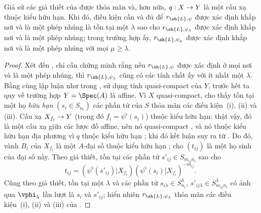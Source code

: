 \documentclass[oneside,10pt]{amsart}
\makeatletter
\renewcommand{\geq}{\geqslant}
\newcommand{\ega@arrow}[2]{\mathchoice{#1}{#2}{#2}{#2}}
\renewcommand{\to}{\ega@arrow{\longrightarrow}{\rightarrow}}
\newcommand{\oldpage}[2][]{\marginnote{\normalfont\footnotesize\textbf{#1}~|~#2}\ignorespaces}
\let\EGAOriginalLabel\label
\renewcommand{\label}[1]{\phantomsection\EGAOriginalLabel{#1}}
\makeatother
\begin{document}
\begin{proposition}[3.8.4]
\label{II.3.8.4}
Giả sử các giả thiết của  được thỏa mãn và, hơn nữa, $q:X\to Y$ là một cấu xạ thuộc kiểu hữu hạn.
Khi đó, điều kiện cần và đủ để $r_{\sh{L},\psi}$ được xác định khắp nơi và là một phép nhúng là tồn tại một $\lambda$ sao cho $r_{\sh{L},\psi_\lambda}$ được xác định khắp nơi và là một phép nhúng;
trong trường hợp ấy, $r_{\sh{L},\psi_\mu}$ được xác định khắp nơi và là một phép nhúng với mọi $\mu\geq\lambda$.
\end{proposition}
\oldpage[II]{70}
\begin{proof}
Xét đến , chỉ cần chứng minh rằng nếu $r_{\sh{L},\psi}$ được xác định ở mọi nơi và là một phép nhúng, thì $r_{\sh{L},\psi_\lambda}$ cũng có các tính chất ấy với ít nhất một $\lambda$.
Bằng cùng lập luận như trong , sử dụng tính quasi-compact của $Y$, trước hết ta quy về trường hợp $Y=\Spec(A)$ là affine.
Vì $X$ quasi-compact,  cho thấy tồn tại một họ \emph{hữu hạn} $(s_i\in S_{n_i})$ các phần tử của $S$ thỏa mãn các điều kiện~(i), (ii) và (iii).
Cấu xạ $X_{f_i}\to Y$ (trong đó $f_i=\psi^\flat(s_i)$) thuộc kiểu hữu hạn: thật vậy, đó là một cấu xạ giữa các lược đồ affine, nên nó quasi-compact , và nó thuộc kiểu hữu hạn địa phương vì $q$ thuộc kiểu hữu hạn ; khi đó kết luận suy ra từ .
Do đó, vành $B_i$ của $X_{f_i}$ là một $A$-đại số thuộc kiểu hữu hạn ;
cho $(t_{ij})$ là một họ sinh của đại số này.
Theo giả thiết, tồn tại các phần tử $s'_{ij}\in S_{m_{ij}n_i}$ sao cho
\[
  t_{ij} = (\psi^\flat(s'_{ij})|X_{f_i})(\psi^\flat(s_i)|X_{f_i})^{-m_{ij}}.
\]
Cũng theo giả thiết, tồn tại một $\lambda$ và các phần tử $s_{i\lambda}\in S_{n_i}^\lambda$, $s'_{ij\lambda}\in S_{m_{ij}n_i}^\lambda$ có ảnh qua $\vphi_\lambda$ lần lượt là $s_i$ và $s'_{ij}$;
hiển nhiên $r_{\sh{L},\psi_\lambda}$ thỏa mãn các điều kiện~(i), (ii) và (iii) của .
\end{proof}
\end{document}
